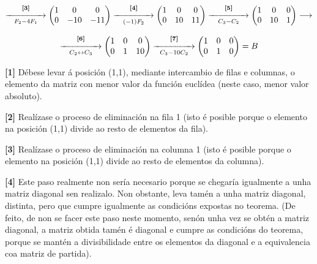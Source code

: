\documentclass[twoside]{report}
\theoremstyle{mystyle}
\begin{document}
$$
\overset{\textbf{[3]}}{\underset{F_{2} - 4F_{1}}{\xrightarrow{\hspace{15mm}}}}
\begin{pmatrix}
1 & 0 & 0 \\
0 & -10 & -11
\end{pmatrix}
\overset{\textbf{[4]}}{\underset{(-1)F_{2}}{\xrightarrow{\hspace{15mm}}}}
\begin{pmatrix}
1 & 0 & 0 \\
0 & 10 & 11
\end{pmatrix}
\overset{\textbf{[5]}}{\underset{C_{3} - C_{2}}{\xrightarrow{\hspace{15mm}}}}
\begin{pmatrix}
1 & 0 & 0 \\
0 & 10 & 1
\end{pmatrix}
\longrightarrow
$$

$$
\overset{\textbf{[6]}}{\underset{C_{2} \leftrightarrow C_{3}}{\xrightarrow{\hspace{15mm}}}}
\begin{pmatrix}
1 & 0 & 0 \\
0 & 1 & 10
\end{pmatrix}
\overset{\textbf{[7]}}{\underset{C_{3} - 10C_{2}}{\xrightarrow{\hspace{15mm}}}}
\begin{pmatrix}
1 & 0 & 0 \\
0 & 1 & 0
\end{pmatrix}
=B
$$

\vspace{5mm}

\noindent \textbf{[1]} Débese levar á posición (1,1), mediante intercambio de filas e columnas, o elemento da matriz con menor valor da función euclídea (neste caso, menor valor absoluto).

\noindent \textbf{[2]} Realízase o proceso de eliminación na fila 1 (isto é posible porque o elemento na posición (1,1) divide ao resto de elementos da fila).

\noindent \textbf{[3]} Realízase o proceso de eliminación na columna 1 (isto é posible porque o elemento na posición (1,1) divide ao resto de elementos da columna).

\noindent \textbf{[4]} Este paso realmente non sería necesario porque se chegaría igualmente a unha matriz diagonal sen realizalo. Non obstante, leva tamén a unha matriz diagonal, distinta, pero que cumpre igualmente as condicións expostas no teorema. (De feito, de non se facer este paso neste momento, senón unha vez se obtén a matriz diagonal, a matriz obtida tamén é diagonal e cumpre as condicións do teorema, porque se mantén a divisibilidade entre os elementos da diagonal e a equivalencia coa matriz de partida).
\end{document}
